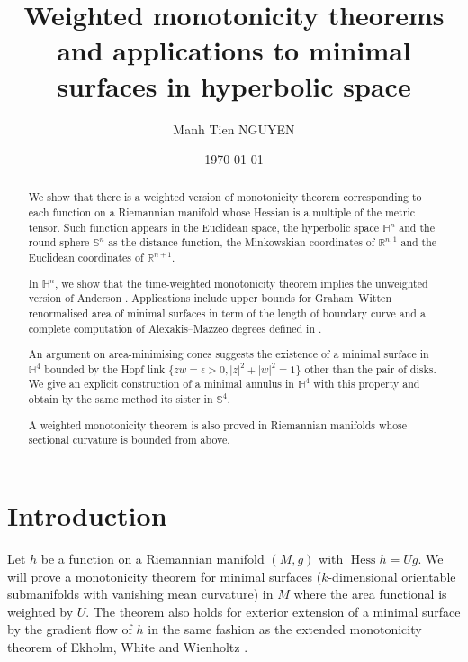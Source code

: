 \documentclass[11pt]{article}
\author{Manh Tien NGUYEN}
\date{\today}
\title{Weighted monotonicity theorems and applications to minimal surfaces in hyperbolic space}
\DeclareMathOperator{\hess}{Hess}
\begin{document}
\maketitle
\begin{abstract}
We show that there is a weighted version of monotonicity theorem corresponding 
to each function on a Riemannian manifold whose Hessian is a multiple of the metric tensor. 
Such function appears in the Euclidean space, the hyperbolic space \( \mathbb{H}^n \) and 
the round sphere \( \mathbb{S}^n \) as the distance function, 
the Minkowskian coordinates of \( \mathbb{R}^{n,1} \) and the Euclidean coordinates of \( \mathbb{R}^{n+1} \). 

In \( \mathbb{H}^n \), we show that the time-weighted monotonicity theorem implies the unweighted version of Anderson 
\cite{Anderson82_CompleteMinimalVarieties}. Applications include upper bounds for Graham--Witten renormalised area 
of minimal surfaces in term of the length of boundary curve and a complete computation of Alexakis--Mazzeo degrees defined in \cite{Alexakis.Mazzeo10_RenormalizedAreaProperly}. 

An argument on area-minimising cones suggests the existence of a minimal surface in \( \mathbb{H}^4 \) bounded by the Hopf
link \( \{zw=\epsilon > 0, |z|^2 +|w|^2 = 1\} \) other than the pair of disks. 
We give an explicit construction of a minimal annulus in \( \mathbb{H}^4 \) with this property and obtain by the same method
its sister in \( \mathbb{S}^4 \).

A weighted monotonicity theorem is also proved in Riemannian manifolds whose sectional curvature is bounded from above.
\end{abstract}
\section{Introduction}
\label{sec:org542a23b}

Let \(h\) be a function on a Riemannian manifold \((M,g)\) with
\(\hess h = Ug\). We will prove a monotonicity
theorem for minimal surfaces (\(k\)-dimensional orientable submanifolds with vanishing mean
curvature) in \(M\) where the area functional is weighted
by \(U\). The theorem also holds for exterior extension of a minimal surface by the
gradient flow of \(h\) in the same fashion as the extended monotonicity theorem of
Ekholm, White and Wienholtz \cite{Ekholm.etal02_EmbeddednessMinimalSurfaces}.
\end{document}
